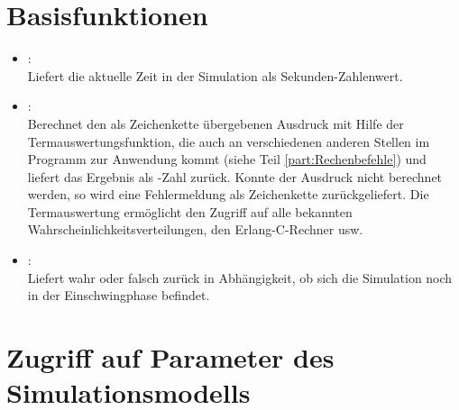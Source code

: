 \section{Basisfunktionen}

\begin{itemize}

\item
{}:\\
Liefert die aktuelle Zeit in der Simulation als Sekunden-Zahlenwert.

\item
{}:\\
Berechnet den als Zeichenkette übergebenen Ausdruck mit Hilfe der Termauswertungsfunktion, die
auch an verschiedenen anderen Stellen im Programm zur Anwendung kommt (siehe Teil \ref{part:Rechenbefehle}) und liefert das Ergebnis
als -Zahl zurück. Konnte der Ausdruck nicht berechnet werden, so wird eine Fehlermeldung als
Zeichenkette zurückgeliefert. Die Termauswertung ermöglicht den Zugriff auf alle bekannten
Wahrscheinlichkeitsverteilungen, den Erlang-C-Rechner usw.
  
\item
{}:\\
Liefert wahr oder falsch zurück in Abhängigkeit, ob sich die Simulation noch in der Einschwingphase befindet.

\end{itemize}

\section{Zugriff auf Parameter des Simulationsmodells}

